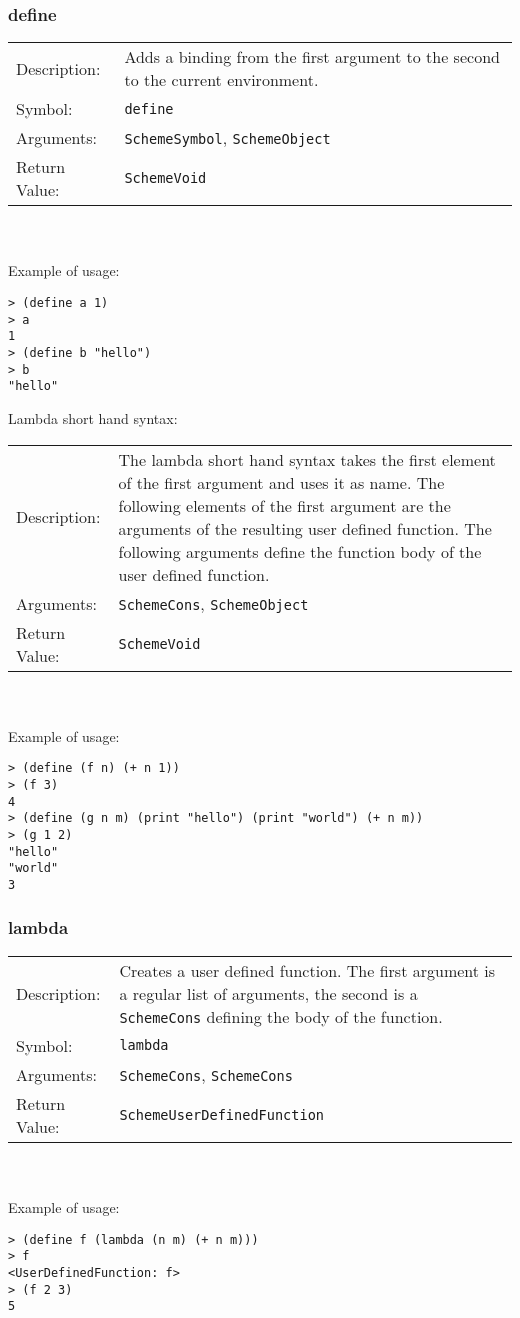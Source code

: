 \documentclass[12pt,a4paper]{scrartcl}
\begin{document}
\subsubsection*{define}
\begin{tabular}{l  p{13cm}}
Description: & Adds a binding from the first argument to the second to the current environment.\\
Symbol: & \lstinline{define}\\
Arguments: & \lstinline{SchemeSymbol}, \lstinline{SchemeObject}\\
Return Value: & \lstinline{SchemeVoid}\\
\end{tabular}
\\
\\
Example of usage:
\begin{lstlisting}
> (define a 1)
> a
1
> (define b "hello")
> b
"hello"
\end{lstlisting}

Lambda short hand syntax:\\
\begin{tabular}{l  p{13cm}}
Description: & The lambda short hand syntax takes the first element of the first argument and uses it as name. The following elements of the first argument are the arguments of the resulting user defined function. The following arguments define the function body of the user defined function.\\
Arguments: & \lstinline{SchemeCons}, \lstinline{SchemeObject}\\
Return Value: & \lstinline{SchemeVoid}\\
\end{tabular}\\
\\
Example of usage:
\begin{lstlisting}
> (define (f n) (+ n 1))
> (f 3)
4
> (define (g n m) (print "hello") (print "world") (+ n m))
> (g 1 2)
"hello"
"world"
3
\end{lstlisting}

\subsubsection*{lambda}
\begin{tabular}{l  p{13cm}}
Description: & Creates a user defined function. The first argument is a regular list of arguments, the second is a \lstinline{SchemeCons} defining the body of the function.\\
Symbol: & \lstinline{lambda}\\
Arguments: & \lstinline{SchemeCons}, \lstinline{SchemeCons}\\
Return Value: & \lstinline{SchemeUserDefinedFunction}\\
\end{tabular}
\\
\\
Example of usage:
\begin{lstlisting}
> (define f (lambda (n m) (+ n m)))
> f
<UserDefinedFunction: f> 
> (f 2 3)
5
\end{lstlisting}
\end{document}
